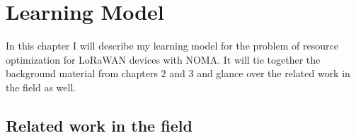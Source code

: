 
\chapter{Learning Model}

In this chapter I will describe my learning model
for the problem of resource optimization for LoRaWAN devices with
NOMA. It will tie together the background material from chapters
2 and 3 and glance over the related work in the field as well.

\section{Related work in the field}

